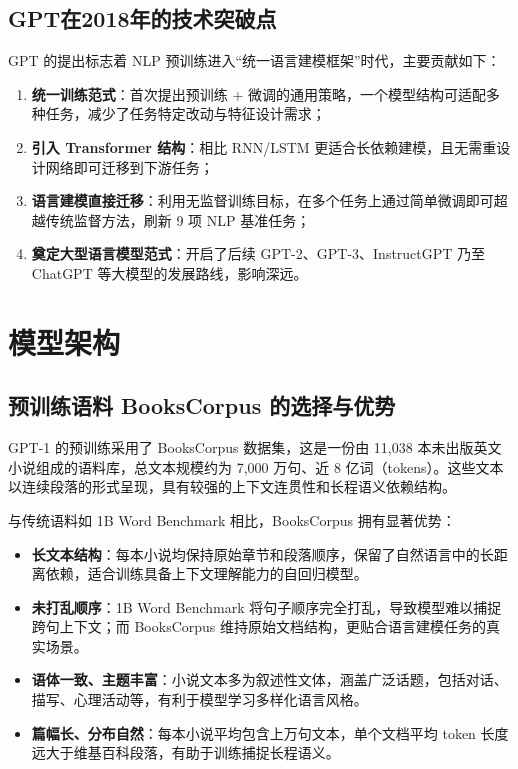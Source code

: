 \documentclass[a4paper,12pt]{article}
\begin{document}
    \subsection{GPT在2018年的技术突破点}
    
    GPT 的提出标志着 NLP 预训练进入“统一语言建模框架”时代，主要贡献如下：
    
    \begin{enumerate}
        \item \textbf{统一训练范式}：首次提出预训练 + 微调的通用策略，一个模型结构可适配多种任务，减少了任务特定改动与特征设计需求；
        \item \textbf{引入 Transformer 结构}：相比 RNN/LSTM 更适合长依赖建模，且无需重设计网络即可迁移到下游任务；
        \item \textbf{语言建模直接迁移}：利用无监督训练目标，在多个任务上通过简单微调即可超越传统监督方法，刷新 9 项 NLP 基准任务；
        \item \textbf{奠定大型语言模型范式}：开启了后续 GPT-2、GPT-3、InstructGPT 乃至 ChatGPT 等大模型的发展路线，影响深远。
    \end{enumerate}
    

\section{模型架构}

\subsection{预训练语料 BooksCorpus 的选择与优势}

GPT-1 的预训练采用了 BooksCorpus 数据集，这是一份由 11,038 本未出版英文小说组成的语料库，总文本规模约为 7,000 万句、近 8 亿词（tokens）。这些文本以连续段落的形式呈现，具有较强的上下文连贯性和长程语义依赖结构。

与传统语料如 1B Word Benchmark 相比，BooksCorpus 拥有显著优势：

\begin{itemize}
    \item \textbf{长文本结构}：每本小说均保持原始章节和段落顺序，保留了自然语言中的长距离依赖，适合训练具备上下文理解能力的自回归模型。
    \item \textbf{未打乱顺序}：1B Word Benchmark 将句子顺序完全打乱，导致模型难以捕捉跨句上下文；而 BooksCorpus 维持原始文档结构，更贴合语言建模任务的真实场景。
    \item \textbf{语体一致、主题丰富}：小说文本多为叙述性文体，涵盖广泛话题，包括对话、描写、心理活动等，有利于模型学习多样化语言风格。
    \item \textbf{篇幅长、分布自然}：每本小说平均包含上万句文本，单个文档平均 token 长度远大于维基百科段落，有助于训练捕捉长程语义。
\end{itemize}
\end{document}
